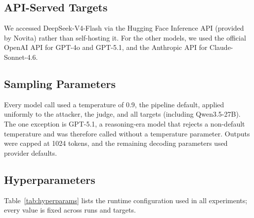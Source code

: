 \documentclass[a4paper,fleqn]{cas-sc}
\begin{document}
\subsection{API-Served Targets}
We accessed DeepSeek-V4-Flash via the Hugging Face Inference API (provided by Novita) rather than self-hosting it.
For the other models, we used the official OpenAI API for GPT-4o and GPT-5.1, and the Anthropic API for Claude-Sonnet-4.6.

\subsection{Sampling Parameters}
Every model call used a temperature of 0.9, the pipeline default, applied uniformly to the attacker, the judge, and all targets (including Qwen3.5-27B). The one exception is GPT-5.1, a reasoning-era model that rejects a non-default temperature and was therefore called without a temperature parameter. Outputs were capped at 1024 tokens, and the remaining decoding parameters used provider defaults.

\subsection{Hyperparameters}
Table~\ref{tab:hyperparams} lists the runtime configuration used in all experiments; every value is fixed across runs and targets.
\end{document}
